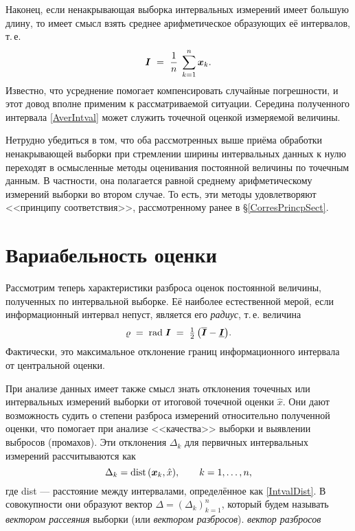 \documentclass[a5paper,openany]{book}
\newcommand{\mbf}[1]{\protect\text{\boldmath$#1$}}
\newcommand{\ov}{\overline}
\newcommand{\un}{\underline}
\newcommand{\dist}{\mathrm{dist}\,}
\renewcommand{\r}{\mathrm{rad}\;}
\begin{document}
Наконец, если ненакрывающая выборка интервальных измерений имеет большую длину, то 
имеет смысл взять среднее арифметическое образующих её интервалов, т.\,е. 
\begin{equation*} 
\label{AverIntval} 
\mbf{I} \  = \  \frac{1}{n}\;\sum_{k=1}^n \mbf{x}_{k}. 
\end{equation*} 
Известно, что усреднение помогает компенсировать случайные погрешности, и этот 
довод вполне применим к рассматриваемой ситуации. Середина полученного интервала 
\eqref{AverIntval} может служить точечной оценкой измеряемой величины. 
  
Нетрудно убедиться в том, что оба рассмотренных выше приёма обработки ненакрывающей 
выборки при стремлении ширины интервальных данных к нулю переходят в осмысленные методы  
оценивания постоянной величины по точечным данным. В частности, она полагается равной 
среднему арифметическому измерений выборки во втором случае. То есть, эти методы 
удовлетворяют <<принципу соответствия>>, рассмотренному ранее в \S\ref{CorresPrincpSect}. 
  
  
\section{Вариабельность оценки} 
\label{ConstVariabSect}  
  
Рассмотрим теперь характеристики разброса оценок постоянной величины, полученных 
по интервальной выборке. Её наиболее естественной мерой, если информационный интервал 
непуст, является его \textit{радиус}, т.\,е. величина 
\begin{equation*}
\varrho\; = \;\r\mbf{I}\; = \;\tfrac{1}{2}\,\bigl(\ov{\mbf{I}} - \un{\mbf{I}}\bigr). 
\end{equation*} 
Фактически, это максимальное отклонение границ информационного интервала от центральной 
оценки. 
  
При анализе данных имеет также смысл знать отклонения точечных или интервальных 
измерений выборки от итоговой точечной оценки $\hat{x}$. Они дают возможность судить 
о степени разброса измерений относительно полученной оценки, что помогает при анализе 
<<качества>> выборки и выявлении выбросов (промахов). Эти отклонения $\Delta_k$ 
для первичных интервальных измерений рассчитываются как 
\begin{equation}
\label{MeasurDiffsInt} 
\Delta_k = \dist(\mbf{x}_{k}, \hat{x}),  \qquad  k = 1,\ldots,n, 
\end{equation} 
где dist --- расстояние между интервалами, определённое как \eqref{IntvalDist}. 
В совокупности они образуют вектор $\Delta = (\Delta_{k})_{k=1}^n$, который будем 
называть \emph{вектором рассеяния} выборки (или \emph{вектором разбросов}). 
 \emph{вектор разбросов} 
    
\end{document}
